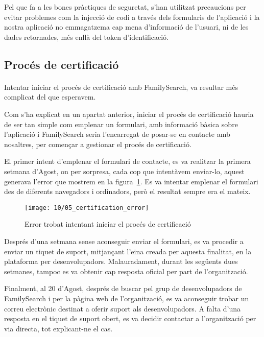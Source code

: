     Pel que fa a les bones pràctiques de seguretat, s'han utilitzat precaucions per evitar problemes com la injecció de codi a través dels formularis de l'aplicació i la nostra aplicació no emmagatzema cap mena d'informació de l'usuari, ni de les dades retornades, més enllà del token d'identificació.


    \subsection{Procés de certificació}

    \paragraph{}
    Intentar iniciar el procés de certificació amb FamilySearch, va resultar més complicat del que esperavem.

    Com s’ha explicat en un apartat anterior, iniciar el procés de certificació hauria de ser tan simple com emplenar un formulari, amb informació bàsica sobre l’aplicació i FamilySearch seria l’encarregat de posar-se en contacte amb nosaltres, per començar a gestionar el procés de certificació.

    El primer intent d’emplenar el formulari de contacte, es va realitzar la primera setmana d’Agost, on per sorpresa, cada cop que intentàvem enviar-lo, aquest generava l’error que mostrem en la figura~\ref{fig:errorCErtification}. Es va intentar emplenar el formulari des de diferents navegadors i ordinadors, però el resultat sempre era el mateix.

    \begin{figure}[h]
        \texttt{[image: 10/05\_certification\_error]}
        \centering
        \caption{Error trobat intentant iniciar el procés de certificació}\label{fig:errorCErtification}
    \end{figure}

    Després d’una setmana sense aconseguir enviar el formulari, es va procedir a enviar un tiquet de suport, mitjançant l’eina creada per aquesta finalitat, en la plataforma per desenvolupadors. Malauradament, durant les següents dues setmanes, tampoc es va obtenir cap resposta oficial per part de l'organització.

    Finalment, al 20 d’Agost, després de buscar pel grup de desenvolupadors de FamilySearch i per la pàgina web de l’organització, es va aconseguir trobar un correu electrònic destinat a oferir suport als desenvolupadors. A falta d’una resposta en el tiquet de suport obert, es va decidir contactar a l'organització per via directa, tot explicant-ne el cas.

